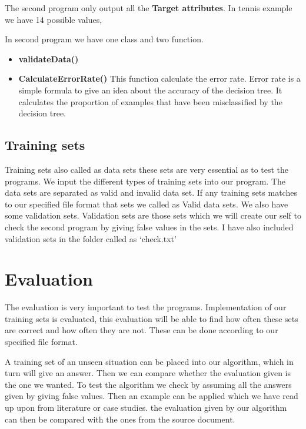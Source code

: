 \documentclass{report}
\begin{document}
The second program only output all the {\bf Target attributes}. In tennis example we have 14 possible values,

In second program we have one class and two function. 
\begin{itemize}

\item {\bf validateData()}

\item {\bf CalculateErrorRate()} This function calculate the error rate. Error rate is a simple formula to give an idea about the accuracy of the decision tree. It calculates the proportion of examples that have been misclassified by the decision tree.


\end{itemize}


\subsection{Training sets}
\label{sec:ts}

Training sets also called as data sets these sets are very essential as to test the programs. We input the different types of training sets into our program. The data sets are separated as valid and invalid data set.
If any training sets matches to our specified file format that sets we called as Valid data sets.
We also have some validation sets. Validation sets are those sets which we will create our self to check the second program by giving false values in the sets. I have also included validation sets in the folder called as `check.txt'

\section{Evaluation}
\label{sec:eva}

The evaluation is very important to test the programs.
Implementation of our training sets is evaluated, this evaluation will be able to find how often these sets are correct and how often they are not. These can be done according to our specified file format.

A training set of an unseen situation can be placed into our algorithm, which in turn will give an answer. Then we can compare whether the evaluation given is the one we wanted.
To test the algorithm we check by assuming all the answers given by giving false values. Then an example can be applied which we have read up upon from literature or case studies. the evaluation given by our algorithm can then be compared with the ones from the source document.
\end{document}
